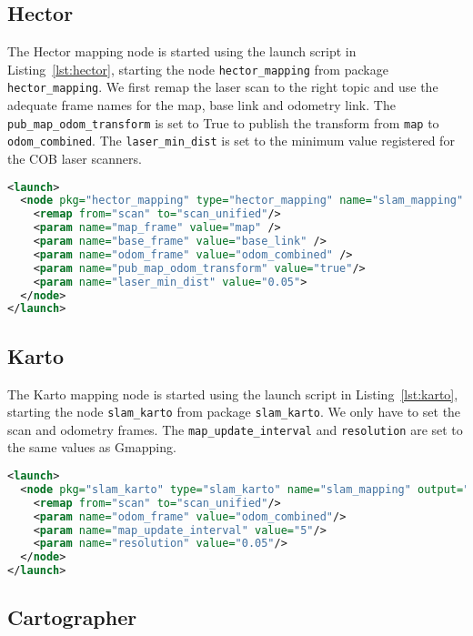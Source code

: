 \subsection{Hector}

The Hector mapping node is started using the launch script in Listing~\ref{lst:hector}, starting the node \texttt{hector\_mapping} from package \texttt{hector\_mapping}. We first remap the laser scan to the right topic and use the adequate frame names for the map, base link and odometry link. The \texttt{pub\_map\_odom\_transform} is set to True to publish the transform from \texttt{map} to \texttt{odom\_combined}. The \texttt{laser\_min\_dist} is set to the minimum value registered for the COB laser scanners.

\begin{lstlisting}[caption={Hector launch file.},label={lst:hector},language=XML]
<launch>
  <node pkg="hector_mapping" type="hector_mapping" name="slam_mapping"    output="screen">
    <remap from="scan" to="scan_unified"/>
    <param name="map_frame" value="map" />
    <param name="base_frame" value="base_link" />
    <param name="odom_frame" value="odom_combined" />
    <param name="pub_map_odom_transform" value="true"/>
    <param name="laser_min_dist" value="0.05">
  </node>
</launch>
\end{lstlisting}

\subsection{Karto}

The Karto mapping node is started using the launch script in Listing~\ref{lst:karto}, starting the node \texttt{slam\_karto} from package \texttt{slam\_karto}. We only have to set the scan and odometry frames. The \texttt{map\_update\_interval} and \texttt{resolution} are set to the same values as Gmapping.

\begin{lstlisting}[caption={Karto launch file.},label={lst:karto},language=XML]
<launch>
  <node pkg="slam_karto" type="slam_karto" name="slam_mapping" output="screen">
    <remap from="scan" to="scan_unified"/>
    <param name="odom_frame" value="odom_combined"/>
    <param name="map_update_interval" value="5"/>
    <param name="resolution" value="0.05"/>
  </node>
</launch>
\end{lstlisting}

\subsection{Cartographer}

